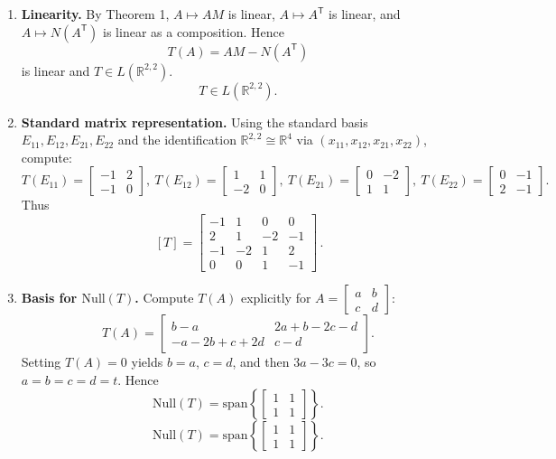 \documentclass[12pt]{article}
\newcommand{\R}{\mathbb{R}}
\begin{document}
\medskip
\begin{enumerate}[label=(\alph*)]
\item \textbf{Linearity.}
By Theorem 1, $A\mapsto AM$ is linear, $A\mapsto A^{\mathsf T}$ is linear, and $A\mapsto N(A^{\mathsf T})$ is linear as a composition. Hence
\[
T(A)=AM-N(A^{\mathsf T})
\]
is linear and $T\in L(\R^{2,2})$.
\[
\boxed{\,T\in L(\R^{2,2}).\,}
\]

\item \textbf{Standard matrix representation.}
Using the standard basis $E_{11},E_{12},E_{21},E_{22}$ and the identification $\R^{2,2}\cong\R^4$ via $(x_{11},x_{12},x_{21},x_{22})$, compute:
\[
T(E_{11})=\begin{bmatrix}-1&2\\-1&0\end{bmatrix},\ 
T(E_{12})=\begin{bmatrix}1&1\\-2&0\end{bmatrix},\ 
T(E_{21})=\begin{bmatrix}0&-2\\1&1\end{bmatrix},\ 
T(E_{22})=\begin{bmatrix}0&-1\\2&-1\end{bmatrix}.
\]
Thus
\[
\boxed{\, [T]=
\begin{bmatrix}
-1&1&0&0\\
2&1&-2&-1\\
-1&-2&1&2\\
0&0&1&-1
\end{bmatrix}\,}.
\]

\item \textbf{Basis for $\mathrm{Null}(T)$.}
Compute $T(A)$ explicitly for $A=\begin{bmatrix}a&b\\c&d\end{bmatrix}$:
\[
T(A)=\begin{bmatrix}
b-a & 2a+b-2c-d\\
-a-2b+c+2d & c-d
\end{bmatrix}.
\]
Setting $T(A)=0$ yields $b=a$, $c=d$, and then $3a-3c=0$, so $a=b=c=d=t$. Hence
\[
\mathrm{Null}(T)=\mathrm{span}\left\{\begin{bmatrix}1&1\\1&1\end{bmatrix}\right\}.
\]
\[
\boxed{\,\mathrm{Null}(T)=\mathrm{span}\left\{\begin{bmatrix}1&1\\1&1\end{bmatrix}\right\}.\,}
\]


\end{enumerate}
\end{document}
